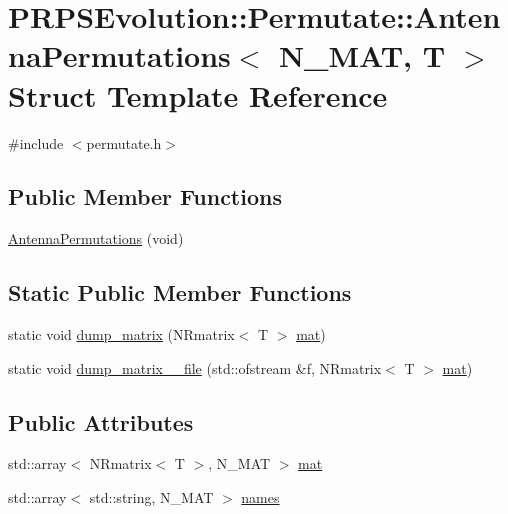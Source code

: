 \hypertarget{struct_p_r_p_s_evolution_1_1_permutate_1_1_antenna_permutations}{\section{\-P\-R\-P\-S\-Evolution\-:\-:\-Permutate\-:\-:\-Antenna\-Permutations$<$ \-N\-\_\-\-M\-A\-T, \-T $>$ \-Struct \-Template \-Reference}
\label{struct_p_r_p_s_evolution_1_1_permutate_1_1_antenna_permutations}
}


{\ttfamily \#include $<$permutate.\-h$>$}

\subsection*{\-Public \-Member \-Functions}
\begin{DoxyCompactItemize}
\item 
\hyperlink{struct_p_r_p_s_evolution_1_1_permutate_1_1_antenna_permutations_a84eb802500b4dc793048baeb50666a6e}{\-Antenna\-Permutations} (void)
\end{DoxyCompactItemize}
\subsection*{\-Static \-Public \-Member \-Functions}
\begin{DoxyCompactItemize}
\item 
static void \hyperlink{struct_p_r_p_s_evolution_1_1_permutate_1_1_antenna_permutations_a1b993d1d3af180e69b2d864bb23b7deb}{dump\-\_\-matrix} (\-N\-Rmatrix$<$ \-T $>$ \hyperlink{struct_p_r_p_s_evolution_1_1_permutate_1_1_antenna_permutations_a4c2a15678968ce79f6332e272bfc9226}{mat})
\item 
static void \hyperlink{struct_p_r_p_s_evolution_1_1_permutate_1_1_antenna_permutations_a8830c191537456f651021d2c32be2b63}{dump\-\_\-matrix\-\_\-\_\-file} (std\-::ofstream \&f, \-N\-Rmatrix$<$ \-T $>$ \hyperlink{struct_p_r_p_s_evolution_1_1_permutate_1_1_antenna_permutations_a4c2a15678968ce79f6332e272bfc9226}{mat})
\end{DoxyCompactItemize}
\subsection*{\-Public \-Attributes}
\begin{DoxyCompactItemize}
\item 
std\-::array$<$ \-N\-Rmatrix$<$ \-T $>$, \-N\-\_\-\-M\-A\-T $>$ \hyperlink{struct_p_r_p_s_evolution_1_1_permutate_1_1_antenna_permutations_a4c2a15678968ce79f6332e272bfc9226}{mat}
\item 
std\-::array$<$ std\-::string, \-N\-\_\-\-M\-A\-T $>$ \hyperlink{struct_p_r_p_s_evolution_1_1_permutate_1_1_antenna_permutations_ab929cd371b9c25afcd6f0acd40490792}{names}
\end{DoxyCompactItemize}
